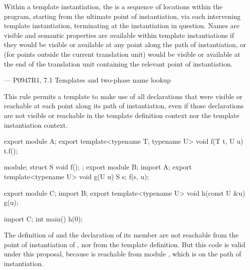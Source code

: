 \hfill\begin{minipage}{\dimexpr\textwidth-1cm}
Within a template instantiation, the 
is a sequence of locations within the program,
starting from the ultimate point of instantiation,
via each intervening template instantiation,
terminating at the instantiation in question.
Names are visible and semantic properties are available
within template instantiations
if they would be visible or available
at any point along the path of instantiation,
or (for points outside the current translation unit)
would be visible or available
at the end of the translation unit
containing the relevant point of instantiation.
\begin{flushright}
--- P0947R1, 7.1 Templates and two-phase name lookup
\end{flushright}
\end{minipage}

This rule permits a template to make use of all declarations
that were visible or reachable at each point along its path of instantiation,
even if those declarations are not visible or reachable
in the template definition context nor the template instantiation context.

\pnum
\begin{example}
\begin{codeblock}
export module A;
export template<typename T, typename U> void f(T t, U u) {
  t.f();
}
\end{codeblock}

\begin{codeblock}
module;
struct S { void f(); };
export module B;
import A;
export template<typename U> void g(U u) { S s; f(s, u); }
\end{codeblock}

\begin{codeblock}
export module C;
import B;
export template<typename U> void h(const U &u) { g(u); }
\end{codeblock}

\begin{codeblock}
import C;
int main() { h(0); }
\end{codeblock}

The definition of  and
the declaration of its member 
are not reachable from the point of instantiation
of , nor from the template definition.
But this code is valid under this proposal, because
 is reachable from module , which
is on the path of instantiation.
\end{example}


